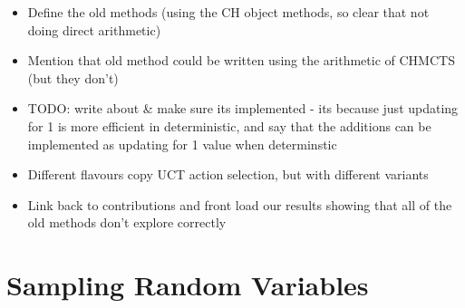     \begin{itemize}
        \item Define the old methods (using the CH object methods, so clear that not doing direct arithmetic)
        \item Mention that old method could be written using the arithmetic of CHMCTS (but they don't) 
        \item TODO: write about \& make sure its implemented - its because just updating for 1 is more efficient in deterministic, and say that the additions can be implemented as updating for 1 value when determinstic
        \item Different flavours copy UCT action selection, but with different variants
        \item Link back to contributions and front load our results showing that all of the old methods don't explore correctly
    \end{itemize}

\section{Sampling Random Variables}
\label{sec:3-5-sampling}

